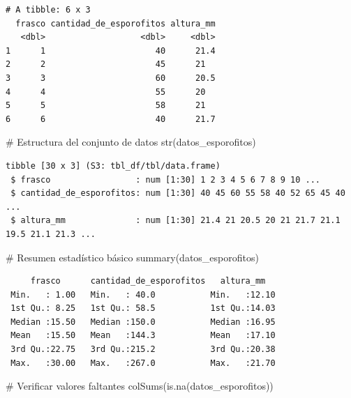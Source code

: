 \documentclass[
  spanish,
  a4paper,
  DIV=11,
  numbers=noendperiod,
  onepage,
  openany]{scrreprt}
\newenvironment{Shaded}{\begin{snugshade}}{\end{snugshade}}
\newcommand{\CommentTok}[1]{\textcolor[rgb]{0.37,0.37,0.37}{#1}}
\newcommand{\FunctionTok}[1]{\textcolor[rgb]{0.28,0.35,0.67}{#1}}
\newcommand{\NormalTok}[1]{\textcolor[rgb]{0.00,0.23,0.31}{#1}}
\begin{document}
\begin{verbatim}
# A tibble: 6 x 3
  frasco cantidad_de_esporofitos altura_mm
   <dbl>                   <dbl>     <dbl>
1      1                      40      21.4
2      2                      45      21  
3      3                      60      20.5
4      4                      55      20  
5      5                      58      21  
6      6                      40      21.7
\end{verbatim}

\begin{Shaded}
\begin{Highlighting}[]
\CommentTok{\# Estructura del conjunto de datos}
\FunctionTok{str}\NormalTok{(datos\_esporofitos)}
\end{Highlighting}
\end{Shaded}

\begin{verbatim}
tibble [30 x 3] (S3: tbl_df/tbl/data.frame)
 $ frasco                 : num [1:30] 1 2 3 4 5 6 7 8 9 10 ...
 $ cantidad_de_esporofitos: num [1:30] 40 45 60 55 58 40 52 65 45 40 ...
 $ altura_mm              : num [1:30] 21.4 21 20.5 20 21 21.7 21.1 19.5 21.1 21.3 ...
\end{verbatim}

\begin{Shaded}
\begin{Highlighting}[]
\CommentTok{\# Resumen estadístico básico}
\FunctionTok{summary}\NormalTok{(datos\_esporofitos)}
\end{Highlighting}
\end{Shaded}

\begin{verbatim}
     frasco      cantidad_de_esporofitos   altura_mm    
 Min.   : 1.00   Min.   : 40.0           Min.   :12.10  
 1st Qu.: 8.25   1st Qu.: 58.5           1st Qu.:14.03  
 Median :15.50   Median :150.0           Median :16.95  
 Mean   :15.50   Mean   :144.3           Mean   :17.10  
 3rd Qu.:22.75   3rd Qu.:215.2           3rd Qu.:20.38  
 Max.   :30.00   Max.   :267.0           Max.   :21.70  
\end{verbatim}

\begin{Shaded}
\begin{Highlighting}[]
\CommentTok{\# Verificar valores faltantes}
\FunctionTok{colSums}\NormalTok{(}\FunctionTok{is.na}\NormalTok{(datos\_esporofitos))}
\end{Highlighting}
\end{Shaded}
\end{document}
